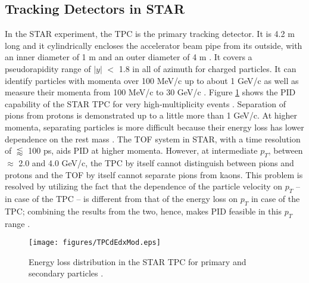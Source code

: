 \subsection{Tracking Detectors in STAR}\label{subsec:tracking_STAR}
In the STAR experiment, the TPC is the primary tracking detector. It is 4.2 m long and it cylindrically encloses the accelerator beam pipe from its outside, with an inner diameter of 1 m and an outer diameter of 4 m \cite{phdthesisnattrass}. It covers a pseudorapidity range of $|y|$ $<$ 1.8 in all of azimuth for charged particles. It can identify particles with momenta over 100 MeV/c up to about 1 GeV/c as well as measure their momenta from 100 MeV/c to 30 GeV/c \cite{Anderson:2003ur}. Figure \ref{fig:STAR_PID} shows the PID capability of the STAR TPC for very high-multiplicity events \cite{0034-4885-73-11-116201}. Separation of pions from protons is demonstrated up to a little more than 1 GeV/c. At higher momenta, separating particles is more difficult because their energy loss has lower dependence on the rest mass \cite{Anderson:2003ur}. The TOF system in STAR, with a time resolution of $\lessapprox$ 100 ps, aids PID at higher momenta. However, at intermediate $p_{T}$, between $\approx$ 2.0 and 4.0 GeV/c, the TPC by itself cannot distinguish between pions and protons and the TOF by itself cannot separate pions from kaons. This problem is resolved by utilizing the fact that the dependence of the particle velocity on $p_{T}$ -- in case of the TPC -- is different from that of the energy loss on $p_{T}$ in case of the TPC; combining the results from the two, hence, makes PID feasible in this $p_{T}$ range \cite{Shao:2005iu}.
\begin{figure}[h]
  \centering
  \texttt{[image: figures/TPCdEdxMod.eps]}\\
  \caption{Energy loss distribution in the STAR TPC for primary and secondary particles \cite{Anderson:2003ur}.}\label{fig:STAR_PID} %
\end{figure}


